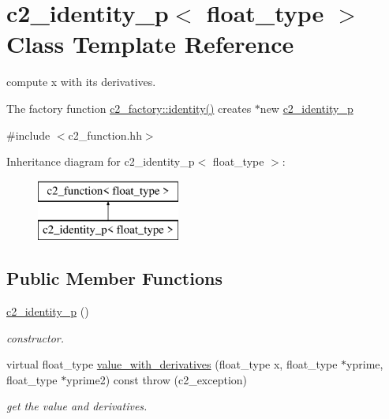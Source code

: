 \hypertarget{classc2__identity__p}{\section{c2\-\_\-identity\-\_\-p$<$ float\-\_\-type $>$ Class Template Reference}
\label{classc2__identity__p}
}


compute x with its derivatives.

The factory function \hyperlink{classc2__factory_a66970667d203c0e63a016b08d2472dc4}{c2\-\_\-factory\-::identity()} creates $\ast$new \hyperlink{classc2__identity__p}{c2\-\_\-identity\-\_\-p}  




{\ttfamily \#include $<$c2\-\_\-function.\-hh$>$}

Inheritance diagram for c2\-\_\-identity\-\_\-p$<$ float\-\_\-type $>$\-:\begin{figure}[H]
\begin{center}
\leavevmode
\includegraphics[height=2.000000cm]{classc2__identity__p}
\end{center}
\end{figure}
\subsection*{Public Member Functions}
\begin{DoxyCompactItemize}
\item 
\hypertarget{classc2__identity__p_a9b00bbd9a2dc1572cf75e38019cfed94}{\hyperlink{classc2__identity__p_a9b00bbd9a2dc1572cf75e38019cfed94}{c2\-\_\-identity\-\_\-p} ()}\label{classc2__identity__p_a9b00bbd9a2dc1572cf75e38019cfed94}

\begin{DoxyCompactList}\small\item\em constructor. \end{DoxyCompactList}\item 
virtual float\-\_\-type \hyperlink{classc2__identity__p_a69a30999382af761b9360179dbedbc88}{value\-\_\-with\-\_\-derivatives} (float\-\_\-type x, float\-\_\-type $\ast$yprime, float\-\_\-type $\ast$yprime2) const   throw (c2\-\_\-exception)
\begin{DoxyCompactList}\small\item\em get the value and derivatives. \end{DoxyCompactList}\end{DoxyCompactItemize}
